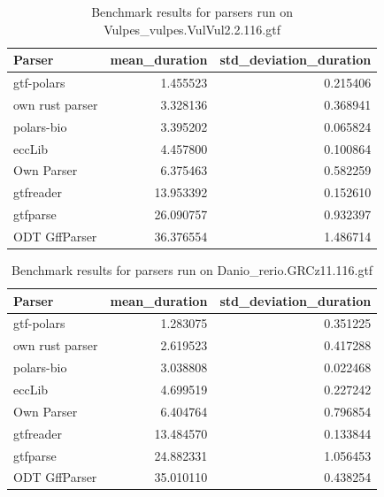 \begin{table}
\caption{Benchmark results for parsers run on Vulpes\_vulpes.VulVul2.2.116.gtf}
\label{tab:benchmark-Vulpes_vulpes.VulVul2.2.116.gtf}
\begin{tabular}{lrr}
\toprule
Parser & mean\_duration & std\_deviation\_duration \\
\midrule
gtf-polars & 1.455523 & 0.215406 \\
own rust parser & 3.328136 & 0.368941 \\
polars-bio & 3.395202 & 0.065824 \\
eccLib & 4.457800 & 0.100864 \\
Own Parser & 6.375463 & 0.582259 \\
gtfreader & 13.953392 & 0.152610 \\
gtfparse & 26.090757 & 0.932397 \\
ODT GffParser & 36.376554 & 1.486714 \\
\bottomrule
\end{tabular}
\end{table}

\begin{table}
\caption{Benchmark results for parsers run on Danio\_rerio.GRCz11.116.gtf}
\label{tab:benchmark-Danio_rerio.GRCz11.116.gtf}
\begin{tabular}{lrr}
\toprule
Parser & mean\_duration & std\_deviation\_duration \\
\midrule
gtf-polars & 1.283075 & 0.351225 \\
own rust parser & 2.619523 & 0.417288 \\
polars-bio & 3.038808 & 0.022468 \\
eccLib & 4.699519 & 0.227242 \\
Own Parser & 6.404764 & 0.796854 \\
gtfreader & 13.484570 & 0.133844 \\
gtfparse & 24.882331 & 1.056453 \\
ODT GffParser & 35.010110 & 0.438254 \\
\bottomrule
\end{tabular}
\end{table}

